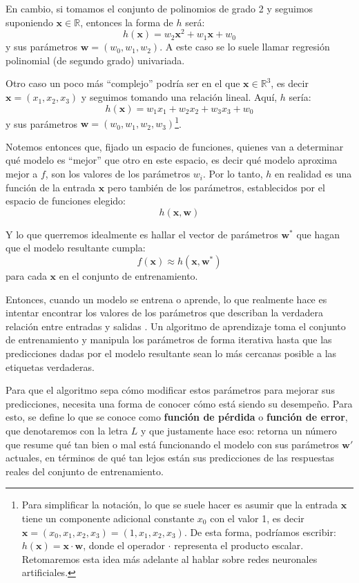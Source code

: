 \documentclass[../../main.tex]{subfiles}
\begin{document}
En cambio, si tomamos el conjunto de polinomios de grado 2 y seguimos suponiendo
\(\bm{x} \in \mathbb{R}\), entonces la forma de \(h\) será:
\[h(\bm{x}) = w_2 \bm{x}^2 + w_1 \bm{x} + w_0\] y sus parámetros \(\bm{w}=(w_0, w_1,
w_2)\). A este caso se lo suele llamar regresión polinomial (de segundo grado) univariada.

Otro caso un poco más ``complejo'' podría ser en el que \(\bm{x} \in \mathbb{R}^3\), es decir
\(\bm{x}=(x_1, x_2, x_3)\) y seguimos tomando una relación lineal. Aquí, \(h\) sería:
\[h(\bm{x}) = w_1 x_1 + w_2 x_2 + w_3 x_3 + w_0\] y sus parámetros \(\bm{w}=(w_0, w_1,
w_2, w_3)\)\footnote{Para simplificar la notación, lo que se suele hacer
es asumir que la entrada \(\bm{x}\) tiene un componente adicional constante \(x_0\)
con el valor 1, es decir \(\bm{x}=(x_0, x_1, x_2, x_3)=(1, x_1, x_2, x_3)\). De esta
forma, podríamos escribir: \(h(\bm{x}) = \bm{x} \cdot \bm{w}\), donde el operador
\(\cdot\) representa el producto escalar. Retomaremos esta idea más adelante al hablar
sobre redes neuronales artificiales.}.

Notemos entonces que, fijado un espacio de funciones, quienes van a determinar qué modelo
es ``mejor'' que otro en este espacio, es decir qué modelo aproxima mejor a \(f\), son los
valores de los parámetros \(w_i\). Por lo tanto, \(h\) en realidad es una función de la
entrada \(\bm{x}\) pero también de los parámetros, establecidos por el espacio de funciones
elegido:
\[h(\bm{x}, \bm{w})\]

Y lo que querremos idealmente es hallar el vector de parámetros \(\bm{w}^*\) que hagan que
el modelo resultante cumpla:
\[f(\bm{x}) \approx h(\bm{x}, \bm{w}^*)\]
para cada \(\bm{x}\) en el conjunto de entrenamiento.

Entonces, cuando un modelo se entrena o aprende, lo que realmente hace es intentar
encontrar los valores de los parámetros que describan la verdadera relación entre entradas
y salidas \cite{prince2024understanding}. Un algoritmo de aprendizaje toma el conjunto de
entrenamiento y manipula los parámetros de forma iterativa hasta que las predicciones
dadas por el modelo resultante sean lo más cercanas posible a las etiquetas verdaderas.

Para que el algoritmo sepa cómo modificar estos parámetros para mejorar sus predicciones,
necesita una forma de conocer cómo está siendo su desempeño. Para esto, se define lo que se
conoce como \textbf{función de pérdida} o \textbf{función de error}, que denotaremos con
la letra \(L\) y que justamente hace eso: retorna un número que resume qué tan bien o mal
está funcionando el modelo con sus parámetros \(\bm{w}'\) actuales, en términos de qué tan
lejos están sus predicciones de las respuestas reales del conjunto de entrenamiento.
\end{document}
